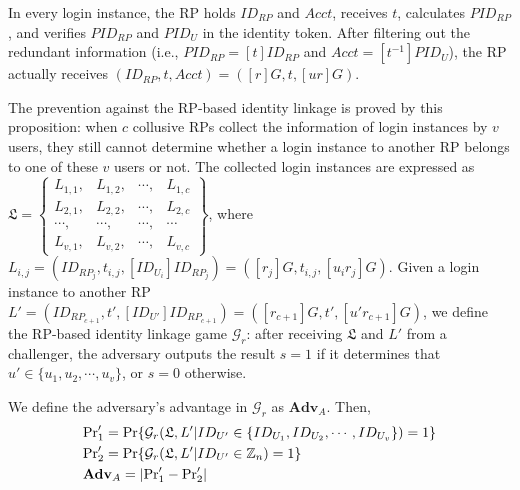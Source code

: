 In every login instance,
    the RP holds $ID_{RP}$ and $Acct$, receives $t$, calculates $PID_{RP}$,
    and verifies $PID_{RP}$ and $PID_U$ in the identity token.
After filtering out the redundant information (i.e., $PID_{RP}= [t]{ID_{RP}}$ and $Acct = [t^{-1}]PID_{U}$),
    the RP actually receives $(ID_{RP}, t, Acct) = ([r]G, t, [ur]G)$.

The prevention against the RP-based identity linkage is proved
    by this proposition:
when $c$ collusive RPs collect the information of login instances by $v$ users,
    they still cannot determine whether a login instance to another RP belongs to one of these $v$ users or not.
The collected login instances are expressed as $\mathfrak{L}=\left\{ \begin{matrix}
L_{1,1}, & L_{1,2}, & \cdots, & L_{1,c}\\
L_{2,1}, & L_{2,2}, & \cdots, & L_{2,c}\\
\cdots, & \cdots, & \cdots, & \cdots\\
L_{v,1}, & L_{v,2}, & \cdots, & L_{v,c}
\end{matrix}\right\}$, where $L_{i, j} = (ID_{RP_j}, t_{i, j}, [ID_{U_i}]{ID_{RP_j}}) = ([r_j]G, t_{i,j}, [u_ir_j]G)$.
Given a login instance to another RP $L'=(ID_{RP_{c+1}}, t', [ID_{U'}]ID_{RP_{c+1}}) = ([r_{c+1}]G, t', [u'r_{c+1}]G)$,
we define the RP-based identity linkage game $\mathcal{G}_r$:
after receiving $\mathfrak{L}$ and $L'$ from a challenger,
    the adversary outputs the result $s = 1$ if it determines that $u' \in \{u_1, u_2, \cdots, u_v\}$,
        or $s = 0$ otherwise.


We define the adversary's advantage in $\mathcal{G}_r$ as $\mathbf{Adv}_A$.
Then,
\begin{align*}
&{\rm Pr}'_1={\rm Pr}\{\mathcal{G}_r(\mathfrak{L}, L'|ID_{U'} \in \{ID_{U_1}, ID_{U_2}, \cdots, ID_{U_v}\})=1\} \\
&{\rm Pr}'_2={\rm Pr}\{\mathcal{G}_r(\mathfrak{L}, L'|ID_{U'} \in \mathbb{Z}_n)=1\}\\
&{\mathbf{Adv}}_A=|{\rm Pr}'_1-{\rm Pr}'_2|
\end{align*}

